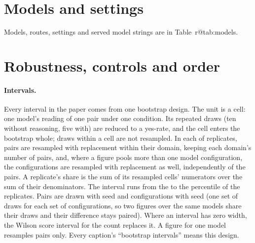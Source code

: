 \documentclass[11pt]{article}
\makeatletter
\DeclareRobustCommand\ref[1]{\ifcsname r@#1\endcsname\rjlocalref{#1}\else\rjlocalref*{X-#1}\fi}}
\makeatother
\begin{document}
\ifsupp
\appendix
\renewcommand{\thesection}{S\arabic{section}}
\renewcommand{\thetable}{S\arabic{table}}
\renewcommand{\thefigure}{S\arabic{figure}}
\renewcommand{\theHtable}{S\arabic{table}}
\renewcommand{\theHfigure}{S\arabic{figure}}

\section{Models and settings}
\label{app:models}

Models, routes, settings and served model strings are in Table~\ref{tab:models}.

\section{Robustness, controls and order}
\label{app:robustness}





\paragraph{Intervals.} Every interval in the paper comes from one bootstrap design. The unit is a cell: one model's
reading of one pair under one condition. Its repeated draws (ten without reasoning, five with) are reduced to a yes-rate,
and the cell enters the bootstrap whole; draws within a cell are not resampled. In each of \BootstrapReplicates{}
replicates, pairs are resampled with replacement within their domain, keeping each domain's number of pairs, and, where
a figure pools more than one model configuration, the configurations are resampled with replacement as well,
independently of the pairs. A replicate's share is the sum of its resampled cells' numerators over the sum of their
denominators. The interval runs from the \BootstrapLowPctile{} to the \BootstrapHighPctile{} percentile of the
replicates. Pairs are drawn with seed \BootstrapSeedPairs{} and configurations with seed \BootstrapSeedModels{} (one set
of draws for each set of configurations, so two figures over the same models share their draws and their difference
stays paired). Where an interval has zero width, the Wilson score interval for the count replaces it. A figure for one
model resamples pairs only. Every caption's ``bootstrap intervals'' means this design.
\end{document}
